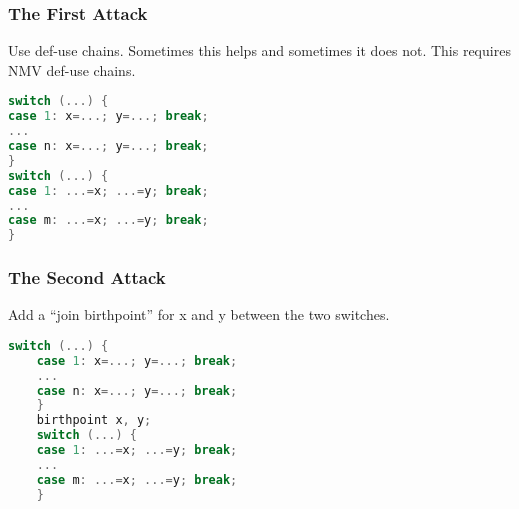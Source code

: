 \subsubsection{The First Attack}


Use def-use chains. Sometimes this helps and sometimes it does not. This requires NMV
def-use chains.

\begin{lstlisting}[language=C,frame=single, caption=An ,label = lst:expr2]
switch (...) {
case 1: x=...; y=...; break;
...
case n: x=...; y=...; break;
}
switch (...) {
case 1: ...=x; ...=y; break;
...
case m: ...=x; ...=y; break;
}
\end{lstlisting}


\subsubsection{The Second Attack }


Add a “join birthpoint”
for x and y between
the two switches. 



\begin{lstlisting}[language=C,frame=single, caption=An ,label = lst:expr2]
    switch (...) {
    case 1: x=...; y=...; break;
    ...
    case n: x=...; y=...; break;
    }
    birthpoint x, y;
    switch (...) {
    case 1: ...=x; ...=y; break;
    ...
    case m: ...=x; ...=y; break;
    }
    \end{lstlisting}